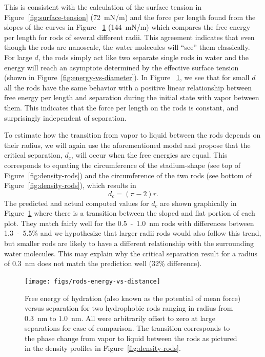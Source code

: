 \documentclass[letterpaper,twocolumn,amsmath,amssymb,prb]{revtex4-1}
\begin{document}
This is consistent with the calculation of the surface tension in
Figure~\ref{fig:surface-tension} (72~mN/m) and the force per length
found from the slopes of the curves in Figure
~\ref{fig:rods-energy-vs-distance} (144~mN/m)  which
compares the free energy per length for rods of several different
radii. This agreement indicates that even though the rods are nanoscale, the
water molecules will ``see'' them classically.  For large $d$, the rods 
simply act like two separate single rods in water and the energy will
reach an asymptote determined by the effective surface tension (shown in 
Figure~\ref{fig:energy-vs-diameter}). In Figure
~\ref{fig:rods-energy-vs-distance}, we see that for small $d$ all the rods 
have the same behavior with a positive linear relationship
between free energy per length and separation during the initial state 
with vapor between them. This indicates that the force 
per length on the rods is constant, and surprisingly independent of separation.

To estimate how the transition from vapor to liquid between the rods depends on their 
radius, we will again use the aforementioned model and propose that 
the critical separation, $d_c$, will occur when the free energies are equal. This 
corresponds to equating the circumference of the stadium-shape (see 
top of Figure~\ref{fig:density-rods}) and the circumference of the two rods (see bottom
of Figure~\ref{fig:density-rods}), which results in
\begin{equation}
d_c = (\pi-2)r.\label{criticalseparation}
\end{equation}
The predicted and actual computed values for $d_c$ are shown graphically in 
Figure~\ref{fig:rods-energy-vs-distance} where there is a transition
between the sloped and flat portion of each plot. They match fairly well for the 
0.5~-~1.0~nm rods with differences between 1.3~-~5.5\% and we hypothesize that larger radii rods
would also follow this trend, but smaller rods are likely to have a different
relationship with the surrounding water molecules. This may explain why the critical
separation result for a radius of 0.3~nm does not match the prediction
well (32\% difference).

\begin{figure}
\begin{center}
\texttt{[image: figs/rods-energy-vs-distance]}
\end{center}
\caption{ Free energy of hydration (also known as the potential of mean force) 
versus separation for two hydrophobic rods ranging in radius from
0.3~nm to 1.0~nm.
All were arbitrarily offset to zero at large separations for ease of comparison. The
transition corresponds to the phase change from
vapor to liquid between the rods as pictured in the density profiles in 
Figure~\ref{fig:density-rods}. }
\label{fig:rods-energy-vs-distance}
\end{figure}
\end{document}

